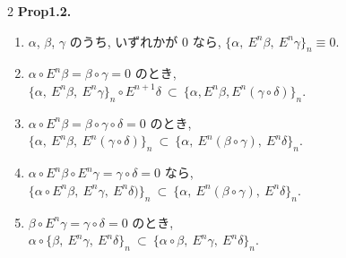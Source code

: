 \documentclass[10pt, leqno]{ltjsarticle}
\newcommand{\Ex}{E}        %
\numberwithin{equation}{section}
\theoremstyle{plain}
\theoremstyle{definition}
\theoremstyle{remark}
\begin{document}
\begin{paracol}{2}
\noindent
\textbf{Prop1.2.}\
\begin{enumerate}
\item[\textnormal{0).}] $\alpha$, $\beta$, $\gamma$ のうち, いずれかが $0$ なら,
\(
\{\alpha,\ \Ex^n\beta,\ \Ex^n\gamma\}_n\equiv0.
\)
\item[\textnormal{i).}] $\alpha\circ \Ex^n\beta=\beta\circ\gamma=0$ のとき,\\
\(
\{\alpha,\ \Ex^n\beta,\ \Ex^n\gamma\}_n\circ\Ex^{n+1}\delta\ \subset\ \{\alpha,\Ex^n \beta, \Ex^n(\gamma\circ\delta)\}_n.
\)
\item[\textnormal{ii).}] $\alpha\circ \Ex^n\beta=\beta\circ\gamma\circ\delta=0$ のとき,\\
\(
\{\alpha,\ \Ex^n\beta,\ \Ex^n(\gamma\circ\delta)\}_n\ \subset\ \{\alpha,\ \Ex^n(\beta\circ\gamma),\ \Ex^n\delta\}_n .
\)
\item[\textnormal{iii).}] $\alpha\circ\Ex^n\beta\circ\Ex^n\gamma=\gamma\circ\delta=0$ なら,\\
\(
\{\alpha\circ\Ex^n\beta,\ \Ex^n\gamma,\ \Ex^n\delta)\}_n\ \subset\ \{\alpha,\ \Ex^n(\beta\circ\gamma),\ \Ex^n\delta\}_n .
\)
\item[\textnormal{iv).}] $\beta\circ\Ex^n\gamma=\gamma\circ\delta=0$ のとき,\\
\(
\alpha\circ\{\beta,\ \Ex^n\gamma,\ \Ex^n\delta\}_n\ \subset\ \{\alpha\circ\beta,\ \Ex^n\gamma,\ \Ex^n\delta\}_n .
\)
\end{enumerate}


\end{paracol}
\end{document}
